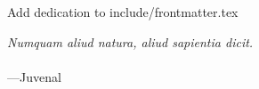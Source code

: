 \begin{frontmatter}
\makefrontmatter                                                               


\begin{dedication}                                                             
    Add dedication to include/frontmatter.tex
\end{dedication}                                                               
\clearpage 


\begin{myepigraph} %
  \vfil                                                                        
  \vfil 
  \hfill {\it Numquam aliud natura, aliud sapientia dicit.} \\
  \vfil 
   \hfill \\
  \vfil 
  \hfill ---Juvenal
  \vfil 
\end{myepigraph}                                                               

\tableofcontents
\listoffigures  %
\listoftables   %


\end{frontmatter}
